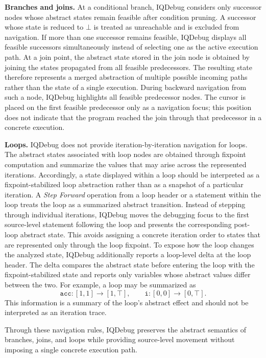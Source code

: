 \documentclass[11pt,oneside]{report}
\theoremstyle{plain}
\theoremstyle{definition}
\theoremstyle{remark}
\begin{document}
\smallskip
\noindent\textbf{Branches and joins.}
At a conditional branch, IQDebug considers only successor nodes whose abstract states remain feasible after condition pruning.
A successor whose state is reduced to \(\bot\) is treated as unreachable and is excluded from navigation.
If more than one successor remains feasible, IQDebug displays all feasible successors simultaneously instead of selecting one as the active execution path.
At a join point, the abstract state stored in the join node is obtained by joining the states propagated from all feasible predecessors.
The resulting state therefore represents a merged abstraction of multiple possible incoming paths rather than the state of a single execution.
During backward navigation from such a node, IQDebug highlights all feasible predecessor nodes.
The cursor is placed on the first feasible predecessor only as a navigation focus; this position does not indicate that the program reached the join through that predecessor in a concrete execution.

\smallskip
\noindent\textbf{Loops.}
IQDebug does not provide iteration-by-iteration navigation for loops.
The abstract states associated with loop nodes are obtained through fixpoint computation and summarize the values that may arise across the represented iterations.
Accordingly, a state displayed within a loop should be interpreted as a fixpoint-stabilized loop abstraction rather than as a snapshot of a particular iteration.
A \textit{Step Forward} operation from a loop header or a statement within the loop treats the loop as a summarized abstract transition.
Instead of stepping through individual iterations, IQDebug moves the debugging focus to the first source-level statement following the loop and presents the corresponding post-loop abstract state.
This avoids assigning a concrete iteration order to states that are represented only through the loop fixpoint.
To expose how the loop changes the analyzed state, IQDebug additionally reports a loop-level delta at the loop header.
The delta compares the abstract state before entering the loop with the fixpoint-stabilized state and reports only variables whose abstract values differ between the two.
For example, a loop may be summarized as
\[
\texttt{acc}: [1,1] \rightarrow [1,\top],
\qquad
\texttt{i}: [0,0] \rightarrow [0,\top].
\]
This information is a summary of the loop's abstract effect and should not be interpreted as an iteration trace.

Through these navigation rules, IQDebug preserves the abstract semantics of branches, joins, and loops while providing source-level movement without imposing a single concrete execution path.
\end{document}
